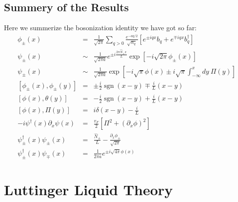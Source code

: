 \documentclass[aps,prb,superscriptaddress,nofootinbib]{revtex4}
\begin{document}
\subsection{Summery of the Results}
Here we summerize the bosonization identity we have got so far:
\begin{eqnarray}
	\phi_\pm(x) &=& \frac{1}{\sqrt{2\pi}} \sum_{q>0} \frac{e^{-a q/2}}{\sqrt{n_q}} \left[e^{\pm i q x} b_{q}+e^{\mp i q x} b_{q}^{\dagger}\right] \\
	\psi_{\pm}(x) &\sim & \frac{1}{\sqrt{2\pi a}} e^{\pm i \frac{2\pi\hat N_{\pm} x}{L}} \exp\left[-i\sqrt{2\pi}\phi_{\pm}(x)\right] \\
	\psi_{\pm}(x) &\sim & \frac{1}{\sqrt{2\pi a}} \exp\left[-i\sqrt{\pi} \phi(x) \pm i\sqrt{\pi} \int^x_{-\infty} dy\ \Pi(y) \right] \\
	\left[\phi_\pm(x), \phi_\pm(y)\right] &=& \pm\frac{i}{2} \operatorname{sgn}(x-y) \mp \frac{i}{L}(x-y) \\
	\left[\phi(x),\theta(y)\right] &=& -\frac{i}{2} \operatorname{sgn}(x-y) + \frac{i}{L}(x-y) \\
	\left[\phi(x), \Pi(y)\right] &=& i \delta(x-y) - \frac{i}{L} \\
	-i\psi^\dagger(x)\partial_x\psi(x) &=& \frac{v_F}{2} \left[\Pi^2 + (\partial_x \phi)^2\right] \\
	\psi^\dagger_\pm(x)\psi_\pm(x) &=& \frac{\hat N_\pm}{L} - \frac{\partial_x \phi_\pm}{\sqrt{2\pi}} \\
	\psi_{\pm}^\dagger(x)\psi_{\mp}(x)  &=& \frac{1}{2\pi a} e^{\pm i\sqrt{4\pi}\phi(x)}
\end{eqnarray}



\section{Luttinger Liquid Theory}
\end{document}
